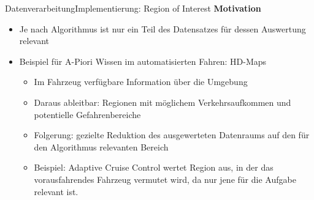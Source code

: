 \documentclass[169, handout	]{THIbeamer} %
\begin{document}
	\begin{frame}{Datenverarbeitung}{Implementierung: Region of Interest}
		\textbf{Motivation}
		\begin{itemize}
			\item Je nach Algorithmus ist nur ein Teil des Datensatzes für dessen Auswertung relevant
			\item Beispiel für A-Piori Wissen im automatisierten Fahren: HD-Maps
			\begin{itemize}
				\item Im Fahrzeug verfügbare Information über die Umgebung
				\item Daraus ableitbar: Regionen mit möglichem Verkehrsaufkommen und potentielle Gefahrenbereiche
				\item Folgerung: gezielte Reduktion des ausgewerteten Datenraums auf den für den Algorithmus relevanten Bereich
				\item Beispiel: Adaptive Cruise Control wertet Region aus, in der das vorausfahrendes Fahrzeug vermutet wird, da nur jene für die Aufgabe relevant ist.
			\end{itemize}
		\end{itemize}
	\end{frame}
\end{document}
